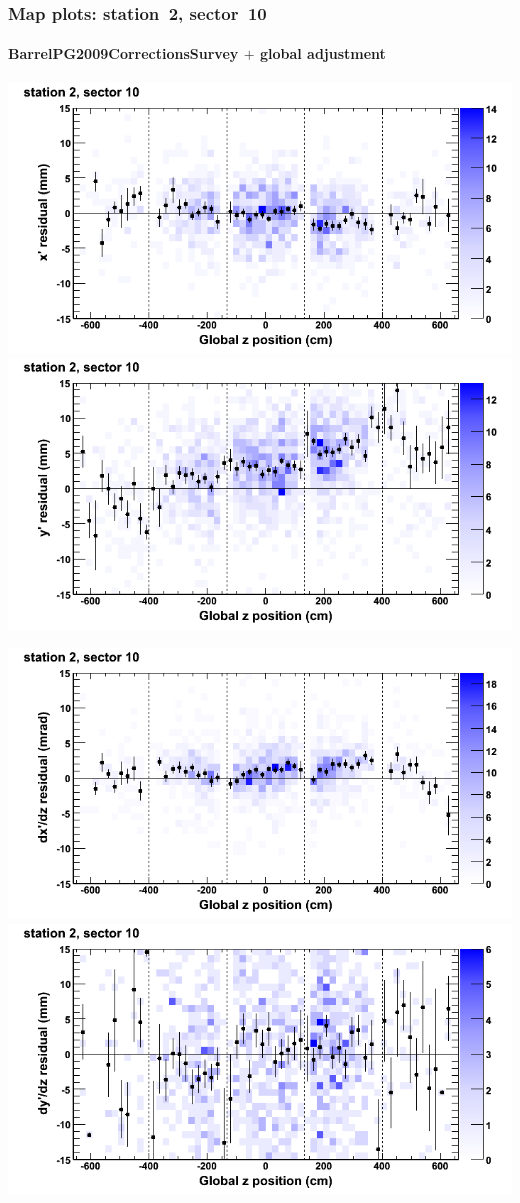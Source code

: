 \documentclass[compress]{beamer}
\begin{document}
\begin{frame}
\frametitle{Map plots: station~2, sector~10}
\framesubtitle{BarrelPG2009CorrectionsSurvey $+$ global adjustment}
\includegraphics[width=0.5\linewidth]{mapplots_re01/DTvsz_st2sec10_x.png}
\includegraphics[width=0.5\linewidth]{mapplots_re01/DTvsz_st2sec10_y.png}

\includegraphics[width=0.5\linewidth]{mapplots_re01/DTvsz_st2sec10_dxdz.png}
\includegraphics[width=0.5\linewidth]{mapplots_re01/DTvsz_st2sec10_dydz.png}
\end{frame}
\end{document}
